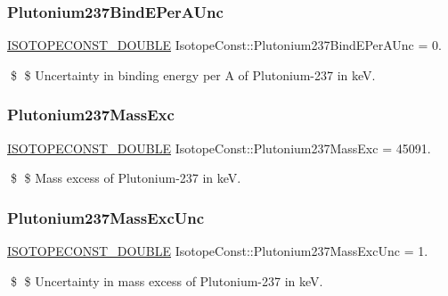 \subsubsection{\texorpdfstring{Plutonium237\+Bind\+E\+Per\+A\+Unc}{Plutonium237BindEPerAUnc}}
{\footnotesize\ttfamily \mbox{\hyperlink{group___isotope_const-_macros_ga8f45a7272ce02c0b4c65c44636ed719a}{I\+S\+O\+T\+O\+P\+E\+C\+O\+N\+S\+T\+\_\+\+D\+O\+U\+B\+LE}} Isotope\+Const\+::\+Plutonium237\+Bind\+E\+Per\+A\+Unc = 0.}

\$ \$ Uncertainty in binding energy per A of Plutonium-\/237 in keV. \mbox{\label{group___isotope_const-_plutonium-_pu237_ga71e4f5d9c0d791292b66bf9b427d0799}} 
\subsubsection{\texorpdfstring{Plutonium237\+Mass\+Exc}{Plutonium237MassExc}}
{\footnotesize\ttfamily \mbox{\hyperlink{group___isotope_const-_macros_ga8f45a7272ce02c0b4c65c44636ed719a}{I\+S\+O\+T\+O\+P\+E\+C\+O\+N\+S\+T\+\_\+\+D\+O\+U\+B\+LE}} Isotope\+Const\+::\+Plutonium237\+Mass\+Exc = 45091.}

\$ \$ Mass excess of Plutonium-\/237 in keV. \mbox{\label{group___isotope_const-_plutonium-_pu237_ga04c3991fc3e9d971666039c7de6b7b43}} 
\subsubsection{\texorpdfstring{Plutonium237\+Mass\+Exc\+Unc}{Plutonium237MassExcUnc}}
{\footnotesize\ttfamily \mbox{\hyperlink{group___isotope_const-_macros_ga8f45a7272ce02c0b4c65c44636ed719a}{I\+S\+O\+T\+O\+P\+E\+C\+O\+N\+S\+T\+\_\+\+D\+O\+U\+B\+LE}} Isotope\+Const\+::\+Plutonium237\+Mass\+Exc\+Unc = 1.}

\$ \$ Uncertainty in mass excess of Plutonium-\/237 in keV. \mbox{\label{group___isotope_const-_plutonium-_pu237_ga93d7e9c55e3b9fa2820f7da68dcfc2aa}} 
